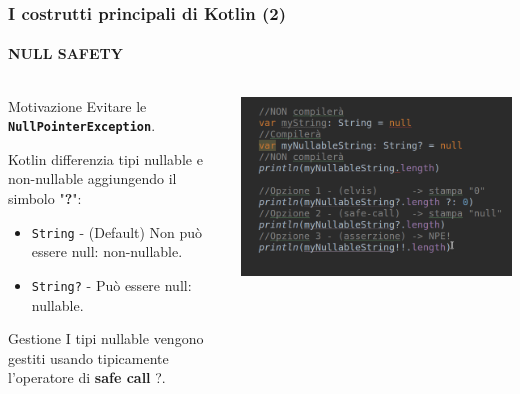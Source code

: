     \begin{frame}
      \frametitle{I costrutti principali di Kotlin (2)}
      \framesubtitle{NULL SAFETY}
      \begin{columns}
        \begin{column}{0.47\textwidth}
          \begin{block}{Motivazione}
             Evitare le \textbf{\texttt{NullPointerException}}.
          \end{block}
          Kotlin differenzia tipi nullable e non-nullable aggiungendo il simbolo "\textbf{?}":
          \begin{itemize}
            \item \texttt{String} - (Default) Non può essere null: non-nullable.
            \item \texttt{String?} - Può essere null: nullable.
          \end{itemize}
          \begin{block}{Gestione}
            I tipi nullable vengono gestiti usando tipicamente l'operatore di \textbf{safe call} \alert{?.}
          \end{block}
        \end{column}
        \begin{column}{0.5\textwidth}
            \includegraphics[scale=0.4]{NullSafety}
        \end{column}
      \end{columns}
    \end{frame}

